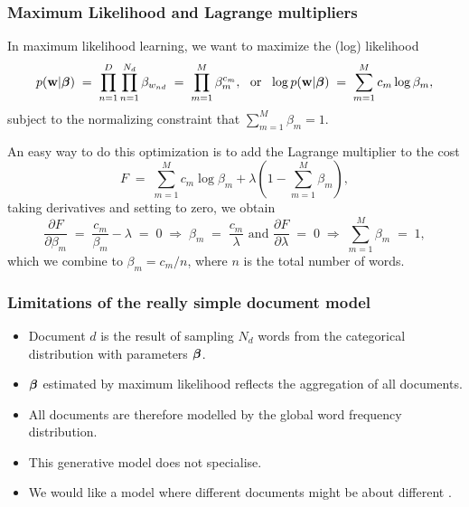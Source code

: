 \begin{frame}
\frametitle{Maximum Likelihood and Lagrange multipliers}

In maximum likelihood learning, we want to maximize the (log) likelihood
%
\[
p({\bf
  w}|\boldsymbol{\beta})\;=\;\prod_{n=1}^D\prod_{n=1}^{N_d}\beta_{w_{nd}}\;=\;
\prod_{m=1}^M\beta_m^{c_m},\text{\ \ or\ \ }
\log p({\bf w}|\boldsymbol{\beta})\;=\;\sum_{m=1}^Mc_m\log \beta_m,
\]
subject to the normalizing constraint that $\sum_{m=1}^M\beta_m=1$.

An easy way to do this optimization is to add the Lagrange multiplier
to the cost
%
\[
F\;=\; \sum_{m=1}^Mc_m\log \beta_m + \lambda(1-\sum_{m=1}^M\beta_m),
\]
%
taking derivatives and setting to zero, we obtain
\[
\frac{\partial F}{\partial
  \beta_m}\;=\;\frac{c_m}{\beta_m}-\lambda\;=\;0\;\Rightarrow\;\beta_m\;=\;\frac{c_m}{\lambda}
\text{\ \ and\ \ }
\frac{\partial F}{\partial \lambda}\;=\;0\;\Rightarrow\;\sum_{m=1}^M\beta_m\;=\;1,
\]
%
which we combine to $\beta_m=c_m/n$, where $n$ is the total number of words.
\end{frame}


\begin{frame}
\frametitle{Limitations of the really simple document model}

\begin{itemize}
\item Document $d$ is the result of sampling $N_d$ words from the
  categorical distribution with parameters $\boldsymbol{\beta}$.
\item $\boldsymbol{\beta}$ estimated by maximum likelihood reflects the aggregation of all documents.
\item All documents are therefore modelled by the global word frequency distribution.
\item This generative model does not specialise. %
\item We would like a model where different documents might be about different .
\end{itemize}

\end{frame}


